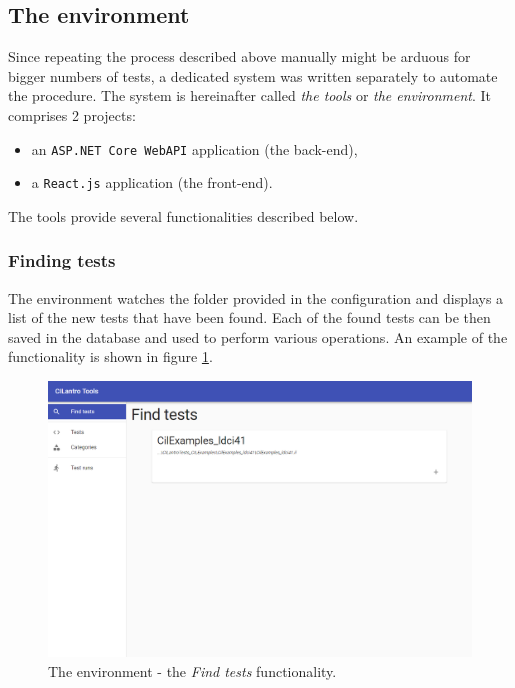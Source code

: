 \documentclass{article}
\numberwithin{equation}{section}
\begin{document}
\subsection{The environment}

Since repeating the process described above manually might be arduous for bigger numbers of tests, a dedicated system was written separately to automate the procedure. The system is hereinafter called \textit{the tools} or \textit{the environment}. It comprises 2 projects:
\begin{itemize}
	\item{an \texttt{ASP.NET Core WebAPI} application (the back-end),}
	\item{a \texttt{React.js} application (the front-end).}
\end{itemize}
The tools provide several functionalities described below.

\subsubsection{Finding tests}

The environment watches the folder provided in the configuration and displays a list of the new tests that have been found. Each of the found tests can be then saved in the database and used to perform various operations. An example of the functionality is shown in figure \ref{fig:tools_find}.

\begin{figure}
	\includegraphics[width=1\textwidth]{tools_find.png}
    \centering
    \caption{The environment - the \textit{Find tests} functionality.}
    \label{fig:tools_find}
\end{figure}
\end{document}
